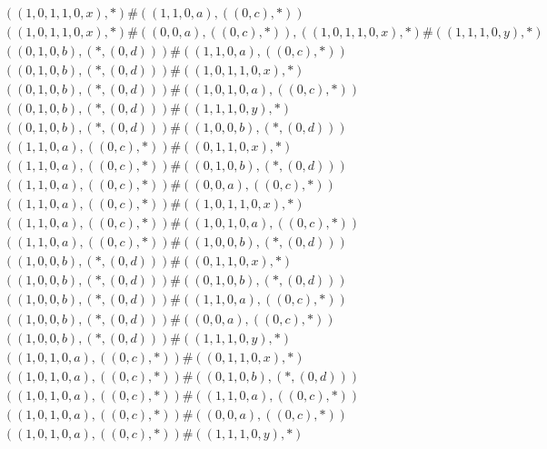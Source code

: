\begin{align*}
	 & \qquad ((1, 0, 1, 1, 0, x), *) \# ((1, 1, 0, a), ((0, c), *)) \\ 
	 & \qquad ((1, 0, 1, 1, 0, x), *) \# ((0, 0, a), ((0, c), *)), ((1, 0, 1, 1, 0, x), *) \# ((1, 1, 1, 0, y), *) \\ 
	 & \qquad ((0, 1, 0, b), (*, (0, d))) \# ((1, 1, 0, a), ((0, c), *)) \\ 
	 & \qquad ((0, 1, 0, b), (*, (0, d))) \# ((1, 0, 1, 1, 0, x), *) \\ 
	 & \qquad ((0, 1, 0, b), (*, (0, d))) \# ((1, 0, 1, 0, a), ((0, c), *)) \\ 
	 & \qquad ((0, 1, 0, b), (*, (0, d))) \# ((1, 1, 1, 0, y), *) \\ 
	 & \qquad ((0, 1, 0, b), (*, (0, d))) \# ((1, 0, 0, b), (*, (0, d))) \\ 
	 & \qquad ((1, 1, 0, a), ((0, c), *)) \# ((0, 1, 1, 0, x), *) \\ 
	 & \qquad ((1, 1, 0, a), ((0, c), *)) \# ((0, 1, 0, b), (*, (0, d))) \\ 
	 & \qquad ((1, 1, 0, a), ((0, c), *)) \# ((0, 0, a), ((0, c), *)) \\ 
	 & \qquad ((1, 1, 0, a), ((0, c), *)) \# ((1, 0, 1, 1, 0, x), *) \\ 
	 & \qquad ((1, 1, 0, a), ((0, c), *)) \# ((1, 0, 1, 0, a), ((0, c), *)) \\ 
	 & \qquad ((1, 1, 0, a), ((0, c), *)) \# ((1, 0, 0, b), (*, (0, d))) \\ 
	 & \qquad ((1, 0, 0, b), (*, (0, d))) \# ((0, 1, 1, 0, x), *) \\ 
	 & \qquad ((1, 0, 0, b), (*, (0, d))) \# ((0, 1, 0, b), (*, (0, d))) \\ 
	 & \qquad ((1, 0, 0, b), (*, (0, d))) \# ((1, 1, 0, a), ((0, c), *)) \\ 
	 & \qquad ((1, 0, 0, b), (*, (0, d))) \# ((0, 0, a), ((0, c), *)) \\ 
	 & \qquad ((1, 0, 0, b), (*, (0, d))) \# ((1, 1, 1, 0, y), *) \\ 
	 & \qquad ((1, 0, 1, 0, a), ((0, c), *)) \# ((0, 1, 1, 0, x), *) \\ 
	 & \qquad ((1, 0, 1, 0, a), ((0, c), *)) \# ((0, 1, 0, b), (*, (0, d))) \\ 
	 & \qquad ((1, 0, 1, 0, a), ((0, c), *)) \# ((1, 1, 0, a), ((0, c), *)) \\ 
	 & \qquad ((1, 0, 1, 0, a), ((0, c), *)) \# ((0, 0, a), ((0, c), *)) \\ 
	 & \qquad ((1, 0, 1, 0, a), ((0, c), *)) \# ((1, 1, 1, 0, y), *) \\ 

\end{align*}
